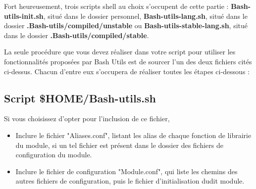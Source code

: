 \documentclass[a4paper,10pt]{article}
\begin{document}
\begin{justify}
    Fort heureusement, trois scripts shell au choix s'occupent de cette partie : \textbf{\color{path}Bash-utils-init.sh}, situé dans le dossier personnel, \textbf{\color{path}Bash-utils-lang.sh}, situé dans le dossier \textbf{\color{path}.Bash-utils/compiled/unstable} ou \textbf{\color{path}Bash-utils-stable-lang.sh}, situé dans le dossier \textbf{\color{path}.Bash-utils/compiled/stable}.
\end{justify}

\begin{justify}
    La seule procédure que vous devez réaliser dans votre script pour utiliser les fonctionnalités proposées par Bash Utils est de sourcer l'un des deux fichiers cités ci-dessus. Chacun d'entre eux s'occupera de réaliser toutes les étapes ci-dessous :
\end{justify}




\color{sec2}
\subsection{Script \color{vars}\$HOME\color{path}/Bash-utils.sh}\color{text}

\begin{justify}
    Si vous choisissez d'opter pour l'inclusion de ce fichier,
\end{justify}

\begin{justify}
    \begin{itemize}
        \item Inclure le fichier "Aliases.conf", listant les alias de chaque fonction de librairie du module, si un tel fichier est présent dans le dossier des fichiers de configuration du module.
    \end{itemize}
\end{justify}

\begin{justify}
    \begin{itemize}
        \item Inclure le fichier de configuration "Module.conf", qui liste les chemins des autres fichiers de configuration, puis le fichier d'initialisation dudit module.
    \end{itemize}
\end{justify}
\end{document}
